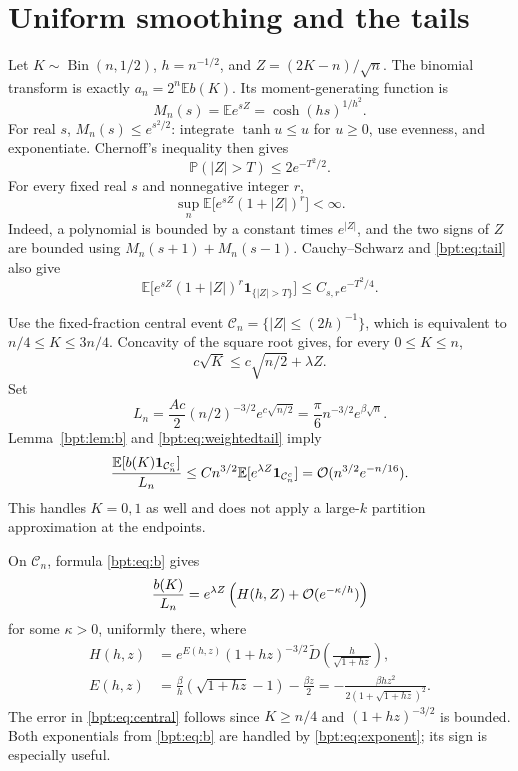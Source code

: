 \documentclass[11pt]{article}
\theoremstyle{remark}\newtheorem{remark}[theorem]{Remark}
\newcommand{\E}{\mathbb E}\newcommand{\Prb}{\mathbb P}
\begin{document}
\section{Uniform smoothing and the tails}\label{bpt:sec:proof}
Let $K\sim\operatorname{Bin}(n,1/2)$, $h=n^{-1/2}$, and
$Z=(2K-n)/\sqrt n$. The binomial transform is exactly $a_n=2^n\E b(K)$.
Its moment-generating function is
\begin{equation}\label{bpt:eq:mgf}
 M_n(s)=\E e^{sZ}=\cosh(hs)^{1/h^2}.
\end{equation}
For real $s$, $M_n(s)\le e^{s^2/2}$: integrate
$\tanh u\le u$ for $u\ge0$, use evenness, and exponentiate.
Chernoff's inequality then gives
\begin{equation}\label{bpt:eq:tail}
 \Prb(|Z|>T)\le2e^{-T^2/2}.
\end{equation}
For every fixed real $s$ and nonnegative integer $r$,
\begin{equation}\label{bpt:eq:uniformmom}
 \sup_n\E\big[e^{sZ}(1+|Z|)^r\big]<\infty.
\end{equation}
Indeed, a polynomial is bounded by a constant times $e^{|Z|}$, and the two signs of $Z$ are bounded using $M_n(s+1)+M_n(s-1)$.
Cauchy--Schwarz and \eqref{bpt:eq:tail} also give
\begin{equation}\label{bpt:eq:weightedtail}
 \E\big[e^{sZ}(1+|Z|)^r\mathbf1_{\{|Z|>T\}}\big]
      \le C_{s,r}e^{-T^2/4}.
\end{equation}

Use the fixed-fraction central event
$\mathcal C_n=\{|Z|\le(2h)^{-1}\}$, which is equivalent to
$n/4\le K\le3n/4$. Concavity of the square root gives, for every $0\le K\le n$,
\[
 c\sqrt K\le c\sqrt{n/2}+\lambda Z.
\]
Set
\[
 L_n=\frac{Ac}{2}(n/2)^{-3/2}e^{c\sqrt{n/2}}
     =\frac\pi6 n^{-3/2}e^{\beta\sqrt n}.
\]
Lemma~\ref{bpt:lem:b} and \eqref{bpt:eq:weightedtail} imply
\begin{equation}\label{bpt:eq:btail}
 \frac{\E[b(K)\mathbf1_{\mathcal C_n^c}]}{L_n}
 \le C n^{3/2}\E[e^{\lambda Z}\mathbf1_{\mathcal C_n^c}]
 =\OO(n^{3/2}e^{-n/16}).
\end{equation}
This handles $K=0,1$ as well and does not apply a large-$k$ partition approximation at the endpoints.

On $\mathcal C_n$, formula \eqref{bpt:eq:b} gives
\begin{equation}\label{bpt:eq:central}
 \frac{b(K)}{L_n}
  =e^{\lambda Z}\left(H(h,Z)+\mathcal O(e^{-\kappa/h})\right)
\end{equation}
for some $\kappa>0$, uniformly there, where
\begin{align}
 H(h,z)&=e^{E(h,z)}(1+hz)^{-3/2}
       \widetilde D\!\left(\frac h{\sqrt{1+hz}}\right),\label{bpt:eq:H}\\
 E(h,z)&=\frac\beta h(\sqrt{1+hz}-1)-\frac{\beta z}{2}
       =-\frac{\beta hz^2}{2(1+\sqrt{1+hz})^2}.\label{bpt:eq:exponent}
\end{align}
The error in \eqref{bpt:eq:central} follows since $K\ge n/4$ and
$(1+hz)^{-3/2}$ is bounded. Both exponentials from \eqref{bpt:eq:b}
are handled by \eqref{bpt:eq:exponent}; its sign is especially useful.
\end{document}
